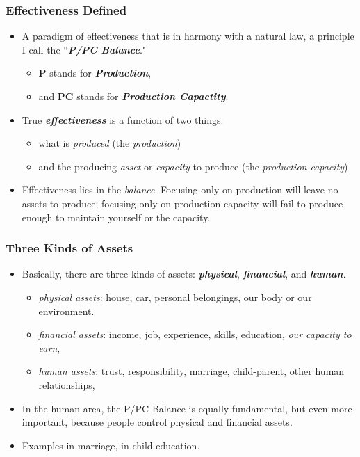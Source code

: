 \documentclass[11pt]{article}
\begin{document}
\subsubsection{Effectiveness Defined}
\begin{itemize}
\item A paradigm of effectiveness that is in harmony with a natural law, a principle I call the ``\emph{\textbf{P/PC Balance}}." 
\begin{itemize}
\item \textbf{P} stands for \emph{\textbf{Production}},
\item  and \textbf{PC} stands for \emph{\textbf{Production Capactity}}. 
\end{itemize}


\item True \emph{\textbf{effectiveness}} is a function of two things: 
\begin{itemize}
\item what is \emph{produced} (the \emph{production})
\item  and the producing \emph{asset} or \emph{capacity} to produce (the \emph{production capacity})
\end{itemize}

\item Effectiveness lies in the \emph{balance}. Focusing only on production will leave no assets to produce; focusing only on production capacity will fail to produce enough to maintain yourself or the capacity.
\end{itemize}
\subsubsection{Three Kinds of Assets}
\begin{itemize}
\item Basically, there are three kinds of assets: \emph{\textbf{physical}}, \emph{\textbf{financial}}, and \emph{\textbf{human}}. 
\begin{itemize}
\item \emph{physical assets}: house, car, personal belongings, our body or our environment. 
\item \emph{financial assets}: income, job, experience, skills, education, \emph{our capacity to earn}, 
\item \emph{human assets}: trust, responsibility, marriage, child-parent, other human relationships, 
\end{itemize}

\item In the human area, the P/PC Balance is equally fundamental, but even more important, because
people control physical and financial assets.

\item Examples in marriage, in child education.
\end{itemize}
\end{document}
